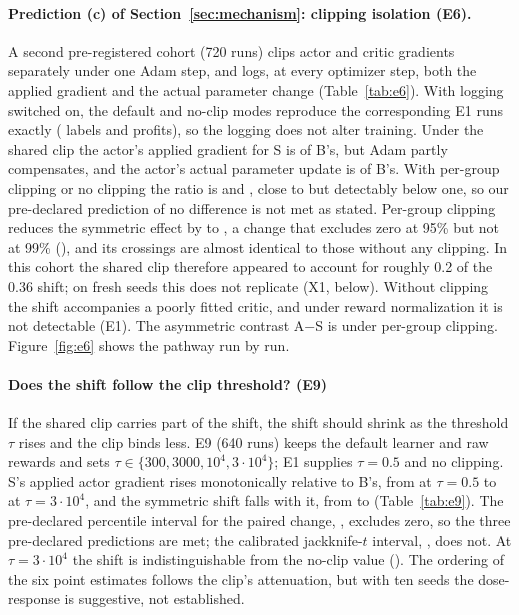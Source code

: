 \paragraph{Prediction (c) of Section~\ref{sec:mechanism}: clipping isolation (E6).}
A second pre-registered cohort (720 runs) clips actor and critic gradients separately under one Adam step,
and logs, at every optimizer step, both the applied gradient and the actual parameter change
(Table~\ref{tab:e6}). With logging switched on, the default and no-clip modes reproduce the corresponding
E1 runs exactly (\VsixRepro{} labels and profits), so the logging does not alter training. Under the shared
clip the actor's applied gradient for S is \VsixGradGlobal{} of B's, but Adam partly compensates, and the
actor's actual parameter update is \VsixUpdGlobal{} of B's. With per-group clipping or no clipping the ratio
is \VsixUpdGroup{} and \VsixUpdNone{}, close to but detectably below one, so our pre-declared prediction of
no difference is not met as stated. Per-group clipping reduces the symmetric effect by \VsixSymGroupChange{}
to \VsixSymGroup{}, a change that excludes zero at 95\% but not at 99\% (\VjtChSixNine{}), and its
crossings are almost identical to those without any clipping. In this cohort the shared clip therefore appeared to
account for roughly 0.2 of the 0.36 shift; on fresh seeds this does not replicate (X1, below). Without clipping
the shift accompanies a poorly fitted critic, and under reward normalization it is not detectable (E1). The asymmetric contrast A$-$S is \VsixAsymGroup{} under per-group
clipping. Figure~\ref{fig:e6} shows the pathway run by run.

\paragraph{Does the shift follow the clip threshold? (E9)}
If the shared clip carries part of the shift, the shift should shrink as the threshold $\tau$ rises and the clip
binds less. E9 (640 runs) keeps the default learner and raw rewards and sets $\tau\in\{300,3000,10^4,3\cdot10^4\}$;
E1 supplies $\tau=0.5$ and no clipping. S's applied actor gradient rises monotonically relative to B's, from
\VnineRatioHalf{} at $\tau=0.5$ to \VnineRatioThirtyK{} at $\tau=3\cdot10^4$, and the symmetric shift falls with it,
from \VnineHalf{} to \VnineThirtyK{} (Table~\ref{tab:e9}). The pre-declared percentile interval for the paired
change, \VnineDosePct{}, excludes zero, so the three pre-declared predictions are met; the calibrated jackknife-$t$
interval, \VjtChNineDose{}, does not. At $\tau=3\cdot10^4$ the shift is indistinguishable from the no-clip value
(\VjtChNineEnd{}). The ordering of the six point estimates follows the clip's attenuation, but with ten seeds the
dose-response is suggestive, not established.

